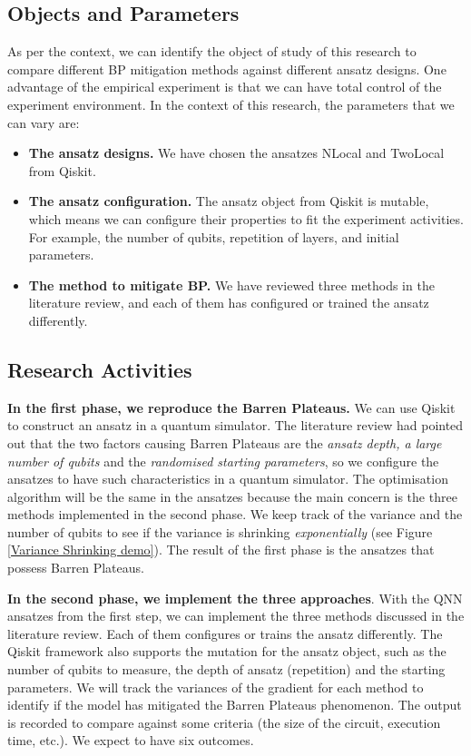\subsection{Objects and Parameters}

As per the context, we can identify the object of study of this research to compare different BP mitigation methods against different ansatz designs.
One advantage of the empirical experiment is that we can have total control of the experiment environment. 
In the context of this research, the parameters that we can vary are:
\begin{itemize}
    \item \textbf{The ansatz designs.} We have chosen the ansatzes NLocal and TwoLocal from Qiskit.
    \item \textbf{The ansatz configuration.} The ansatz object from Qiskit is mutable, which means we can configure their properties to fit the experiment activities. For example, the number of qubits, repetition of layers, and initial parameters.
    \item \textbf{The method to mitigate BP.} We have reviewed three methods in the literature review, and each of them has configured or trained the ansatz differently.
\end{itemize}

\subsection{Research Activities}
\textbf{In the first phase, we reproduce the Barren Plateaus.} 
We can use Qiskit \cite{Qiskit} to construct an ansatz in a quantum simulator.
The literature review had pointed out that the two factors causing Barren Plateaus are the \textit{ansatz depth, a large number of qubits} and the \textit{randomised starting parameters}, so we configure the ansatzes to have such characteristics in a quantum simulator.
The optimisation algorithm will be the same in the ansatzes because the main concern is the three methods implemented in the second phase.
We keep track of the variance and the number of qubits to see if the variance is shrinking  \textit{exponentially} (see Figure \ref{Variance Shrinking demo}).
The result of the first phase is the ansatzes that possess Barren Plateaus.

\textbf{In the second phase, we implement the three approaches}.
With the QNN ansatzes from the first step, we can implement the three methods discussed in the literature review.
Each of them configures or trains the ansatz differently.
The Qiskit framework also supports the mutation for the ansatz object, such as the number of qubits to measure, the depth of ansatz (repetition) and the starting parameters.
We will track the variances of the gradient for each method to identify if the model has mitigated the Barren Plateaus phenomenon.
The output is recorded to compare against some criteria (the size of the circuit, execution time, etc.). We expect to have six outcomes.

